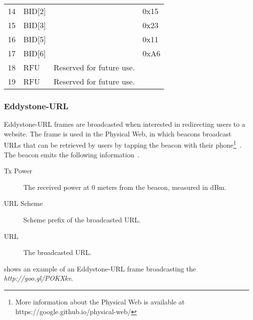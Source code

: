 \begin{table}[h!]
\begin{tabular}{llll}
14                   & BID{[}2{]}     &                                       & 0x15           \\
15                   & BID{[}3{]}     &                                       & 0x23           \\
16                   & BID{[}5{]}     &                                       & 0x11           \\
17                   & BID{[}6{]}     &                                       & 0xA6           \\
18                   & RFU            & Reserved for future use.               &                \\
19                   & RFU            & Reserved for future use.               &
\end{tabular}
\end{table}

\subsubsection{Eddystone-URL}

Eddystone-URL frames are broadcasted when interested in redirecting users to a website. The frame is used in the Physical Web, in which beacons broadcast URLs that can be retrieved by users by tapping the beacon with their phone\footnote{More information about the Physical Web is available at https://google.github.io/physical-web/}~\cite{eddystone:protocol-url-spec}. The beacon emits the following information~\cite{eddystone:protocol-url-spec}.

\begin{description}
\item[Tx Power] The received power at 0 meters from the beacon, measured in dBm.
\item[URL Scheme] Scheme prefix of the broadcasted URL.
\item[URL] The broadcasted URL.
\end{description}

 shows an example of an Eddystone-URL frame broadcasting the \emph{http://goo.gl/POKXkv}.

